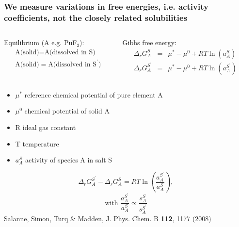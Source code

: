 \documentclass{beamer}
\begin{document}
\begin{frame}
    \frametitle{We measure variations in free energies, i.e. activity coefficients, not the closely related solubilities}
    \begin{columns}
        \begin{column}{6cm}
            Equilibrium (A e.g. PuF$_3$):
            \begin{eqnarray}
                \text{A(solid)} = \text{A(dissolved in S)}  \\
                \text{A(solid)} = \text{A(dissolved in S}^\prime)
            \end{eqnarray}
        \end{column}
        \begin{column}{6cm}
            Gibbs free energy:
            \begin{eqnarray}
                \Delta_r G^S_A &=& \mu^* - \mu^0 + RT\ln(a_A^S) \nonumber \\
                \Delta_r G^{S^{\prime}}_A &=& \mu^* - \mu^0 + RT\ln(a_{A}^{S^\prime}) \nonumber
            \end{eqnarray}
        \end{column}
    \end{columns}
    \begin{itemize}
        \item $\mu^*$ reference chemical potential of pure element A
        \item $\mu^0$ chemical potential of solid A
        \item R ideal gas constant
        \item T temperature
        \item $a_A^S$ activity of species A in salt S
    \end{itemize}
    \begin{equation}
        \Delta_r G^{S^\prime}_A - \Delta_r G^S_A = RT\ln\left( \frac{a_{A}^{S^\prime}}{a_A^S}  \right),\nonumber
    \end{equation}
    \begin{equation}
        \text{with }\frac{a_{A}^{S^\prime}}{a_A^S} \propto \frac{s_A^S}{s_{A}^{S^\prime}} \nonumber
    \end{equation}
    \scriptsize{Salanne, Simon, Turq \& Madden, J. Phys. Chem. B \textbf{112}, 1177 (2008)}
\end{frame}
\end{document}

